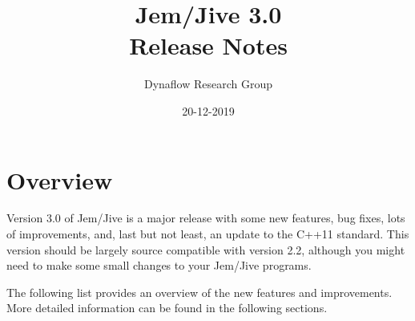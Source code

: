 \documentclass[a4paper]{article}
\title {Jem/Jive 3.0\\[1ex]
        Release Notes}
\author{Dynaflow Research Group}
\date  {20-12-2019}
\begin{document}
\maketitle

\section{Overview}

Version 3.0 of Jem/Jive is a major release with some new features, bug
fixes, lots of improvements, and, last but not least, an update to the
C++11 standard. This version should be largely source compatible with
version 2.2, although you might need to make some small changes to your
Jem/Jive programs.

The following list provides an overview of the new features and
improvements. More detailed information can be found in the following
sections.
\end{document}
